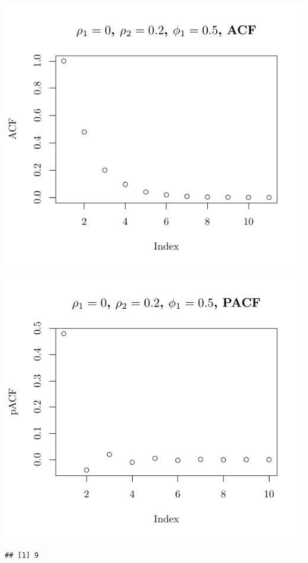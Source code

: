\documentclass[10pt]{paper}\usepackage[]{graphicx}\usepackage[]{color}
\makeatletter
\def\maxwidth{ %
  \ifdim\Gin@nat@width>\linewidth
    \linewidth
  \else
    \Gin@nat@width
  \fi
}
\newenvironment{kframe}{%
 \def\at@end@of@kframe{}%
 \ifinner\ifhmode%
  \def\at@end@of@kframe{\end{minipage}}%
  \begin{minipage}{\columnwidth}%
 \fi\fi%
 \def\FrameCommand##1{\hskip\@totalleftmargin \hskip-\fboxsep
 \colorbox{shadecolor}{##1}\hskip-\fboxsep
     \hskip-\linewidth \hskip-\@totalleftmargin \hskip\columnwidth}%
 \MakeFramed {\advance\hsize-\width
   \@totalleftmargin\z@ \linewidth\hsize
   \@setminipage}}%
 {\par\unskip\endMakeFramed%
 \at@end@of@kframe}
\newenvironment{knitrout}{}{} %
\makeatother
\begin{document}
\begin{knitrout}
{\centering \includegraphics[width=\maxwidth]{figure/graphics-plotter-63} 

}




{\centering \includegraphics[width=\maxwidth]{figure/graphics-plotter-64} 

}


\begin{kframe}\begin{verbatim}
## [1] 9
\end{verbatim}
\end{kframe}


\end{knitrout}
\end{document}
